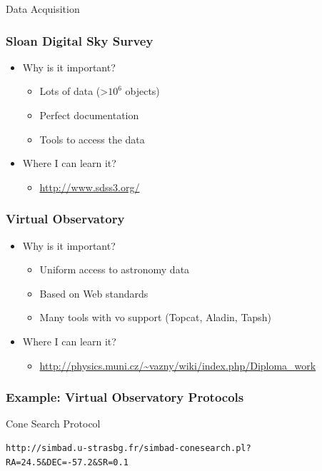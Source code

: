 \documentclass[fleqn]{beamer}
\begin{document}
\begin{section}{Data Acquisition}
  \begin{frame}\frametitle{Sloan Digital Sky Survey}
  \begin{itemize}
    \item{Why is it important?}
      \begin{itemize}
        \item Lots of data (>$10^6$ objects)
        \item Perfect documentation
        \item Tools to access the data
      \end{itemize}
    \item{Where I can learn it?}
      \begin{itemize}
       \item \url{http://www.sdss3.org/}
      \end{itemize}
  \end{itemize}
  \end{frame}

  \begin{frame}\frametitle{Virtual Observatory}
  \begin{itemize}
    \item{Why is it important?}
      \begin{itemize}
        \item Uniform access to astronomy data
        \item Based on Web standards
        \item Many tools with vo support (Topcat, Aladin, Tapsh)
      \end{itemize}
    \item{Where I can learn it?}
      \begin{itemize}
       \item \url{http://physics.muni.cz/~vazny/wiki/index.php/Diploma_work}
      \end{itemize}
  \end{itemize}
  \end{frame}


\begin{frame}[containsverbatim]\frametitle{Example: Virtual
    Observatory Protocols}

Cone Search Protocol

\begin{lstlisting}
http://simbad.u-strasbg.fr/simbad-conesearch.pl?RA=24.5&DEC=-57.2&SR=0.1
\end{lstlisting}



\end{frame}
\end{section}
\end{document}
